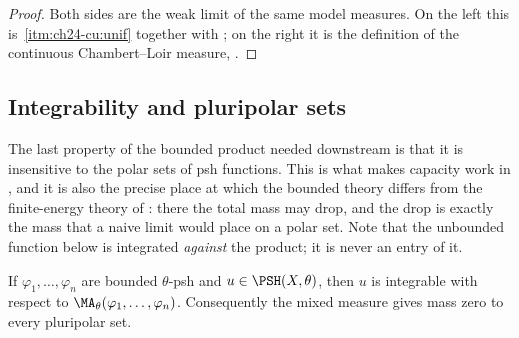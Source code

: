 \begin{proof}
Both sides are the weak limit of the same model measures.  On the left this
is \,\cref{itm:ch24-cu:unif} together with
; on the right it is the definition of the
continuous Chambert--Loir measure,
.
\end{proof}

\subsection{Integrability and pluripolar sets}
\label{sec:ch24-integrability}

The last property of the bounded product needed downstream is that it is
insensitive to the polar sets of psh functions.  This is what makes capacity
work in , and it is also the precise place at which
the bounded theory differs from the finite-energy theory of
: there the total mass may drop, and the drop is
exactly the mass that a naive limit would place on a polar set.  Note that
the unbounded function below is integrated \emph{against} the product; it is
never an entry of it.

\begin{proposition}\label{prop:bounded-ma-no-polar-mass}
If \(\varphi_1,\ldots,\varphi_n\) are bounded \(\theta\)-psh and
\(u\in\PSH(X,\theta)\), then \(u\) is integrable with respect to
\(\MA_\theta(\varphi_1,\ldots,\varphi_n)\). Consequently the mixed measure
gives mass zero to every pluripolar set.
\end{proposition}

